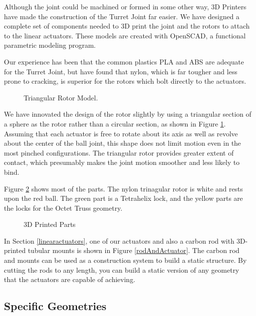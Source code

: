 \documentclass[11pt]{article}
\begin{document}
 Although the joint could be machined or formed in some other way,
 3D Printers have made the construction of the Turret Joint far easier.
 We have designed a complete set of components needed to 3D print the joint and the rotors to attach to
 the linear actuators. These models are created with OpenSCAD, a functional parametric modeling program.

 Our experience has been that the common plastics PLA and ABS are adequate for the Turret Joint,
 but have found that nylon, which is far tougher and less prone to cracking, is superior for the
 rotors which bolt directly to the actuators.

 \begin{figure}[!ht]
  \centering
    \caption[Triangular Rotor Model]{Triangular Rotor Model.}
      \label{rotormodel}
\end{figure}

 We have innovated the design of the rotor slightly by using a triangular section of a sphere as the
 rotor rather than a circular section, as shown in Figure \ref{rotormodel}.
 Assuming that each actuator is free to rotate about its axis as well as revolve about the
 center of the ball joint, this shape does not limit motion even in the most pinched
 configurations. The triangular rotor provides greater extent of contact,
 which presumably makes the joint motion
 smoother and less likely to bind.
 

 Figure \ref{parts} shows most of the parts. The nylon trinagular rotor is white and rests upon
 the red ball. The green part is a Tetrahelix lock, and the yellow parts are the locks for the Octet Truss
 geometry.

\begin{figure}[!ht]
  \centering
    \caption[3D Printed Parts]{3D Printed Parts}
      \label{parts}
\end{figure}

In Section \ref{linearactuators}, one of our actuators and also a carbon rod with 3D-printed tubular mounts
is shown in Figure \ref{rodAndActuator}.
The carbon rod and mounts can be used as a construction system to build a static structure.
By cutting the rods to any length, you can build a static version of any geometry that the actuators
are capable of achieving.

\subsection{Specific Geometries}
\end{document}
